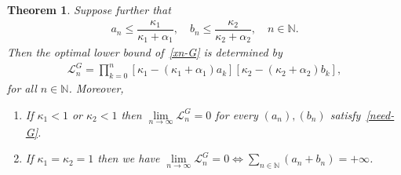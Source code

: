 \documentclass[a4paper, 11pt]{article}
\newtheorem{theorem}{Theorem}[section]
\begin{document}
\begin{theorem}\label{theo-L-G}
Suppose further that 
\begin{align}\label{need-G}
a_n \le \dfrac{\kappa_1}{\kappa_1 + \alpha_1}, \quad b_n \le \dfrac{\kappa_2}{\kappa_2 + \alpha_2}, \quad n \in \mathbb{N}.
\end{align}
Then the optimal lower bound of~\eqref{xn-G} is determined by 
\begin{align}\label{Ln-G}
\mathcal{L}_n^{G}=\prod_{k=0}^n {[\kappa_1-(\kappa_1+\alpha_1)a_k][\kappa_2-(\kappa_2+\alpha_2)b_k]},
\end{align}
for all $n \in \mathbb{N}$. Moreover,
\begin{enumerate}
\item [(i)] If $\kappa_1 < 1$ or $\kappa_2 < 1$ then $\displaystyle \lim\limits_{n\to \infty} \mathcal{L}_n^G = 0$ for every $(a_n), (b_n)$ satisfy~\eqref{need-G}.
\item [(ii)] If $\kappa_1 = \kappa_2 = 1$ then we have $\displaystyle \lim\limits_{n\to \infty} \mathcal{L}_n^G = 0 \Longleftrightarrow \sum_{n \in \mathbb{N}} (a_n + b_n) = +\infty$.
\end{enumerate}
\end{theorem}
\end{document}
